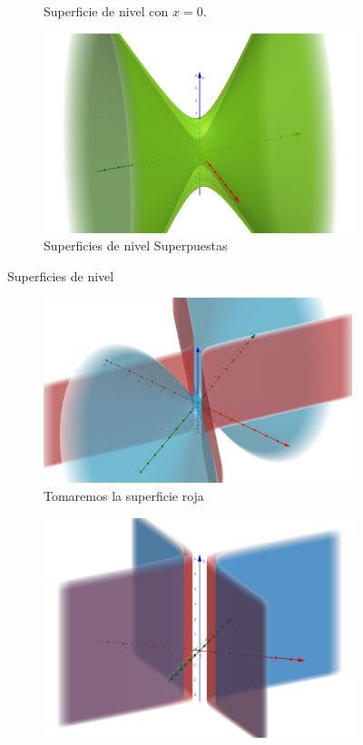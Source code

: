 \documentclass[letterpaper,11pt]{article}
\begin{document}
\begin{enumerate}
\begin{figure}[h]
\begin{subfigure}{.4\textwidth}
		\caption{Superficie de nivel con $x = 0$.}
		\label{F1_3}
	\end{subfigure}
\begin{subfigure}{0.5\textwidth}
	\centering
	\includegraphics[width=\linewidth]{img/2b1}
	\caption{Superficies de nivel Superpuestas}
\end{subfigure}
	\caption{Superficies de nivel}
	\label{F1}
\end{figure}
\begin{figure}[h!]
	\centering
	\begin{subfigure}{.7\textwidth}
		\centering
		\includegraphics[width=9cm]{img/2a1}
		\caption{Tomaremos la superficie roja }
		\label{F1_1}
	\end{subfigure}
	\begin{subfigure}{0.3\textwidth}
		\includegraphics[width=\linewidth]{img/2c1}

\end{subfigure}
\end{figure}
\end{enumerate}
\end{document}
